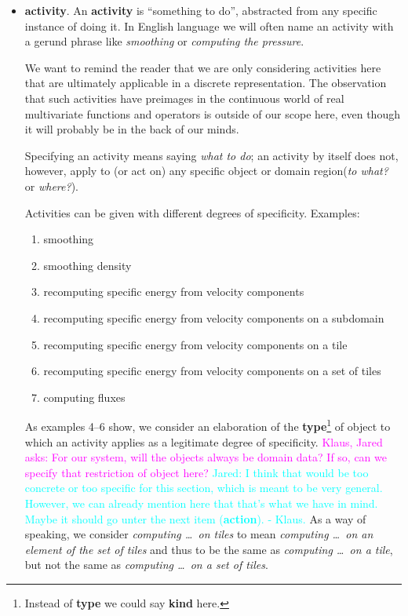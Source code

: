 \documentclass{article}
\newcommand{\JaredRfromKW}[1]   {\textcolor{cyan}{Jared: #1 - Klaus.}}
\newcommand{\KlausQfromJO}[1]   {\textcolor{magenta}{Klaus, Jared asks: #1}}
\newcommand{\domregion}              {domain region\xspace}    %
\begin{document}
\begin{itemize}
\item \textbf{activity}.
An \textbf{activity} is ``something to do'', abstracted from any
specific instance of doing it.
In English language we will often name an activity with a
gerund phrase like \emph{smoothing} or \emph{computing the pressure}.

We want to remind the reader that we are only considering activities
here that are ultimately applicable in a discrete representation.
The observation that such activities have preimages in the continuous
world of real multivariate functions and operators is outside
of our scope here, even though it will probably be in the back of our minds.

Specifying an activity
means saying \textit{what to do}; an activity by itself  does not,
however, apply to (or act on) any specific object or \domregion (\textit{to what?} or \textit{where?}).

Activities can be given with different degrees of specificity.
Examples:
\begin{enumerate}
\item smoothing
\item smoothing density
\item recomputing specific energy from velocity components
\item recomputing specific energy from velocity components on a subdomain
\item recomputing specific energy from velocity components on a tile
\item recomputing specific energy from velocity components on a set of tiles
\item computing fluxes
\end{enumerate}
As examples 4--6 show, we consider an elaboration of the \textbf{type}\footnote{
Instead of \textbf{type} we could say \textbf{kind} here.}
 of object to which
an activity applies as a legitimate degree of specificity.  \KlausQfromJO{For
our system, will the objects always be domain data?  If so, can we specify that
restriction of object here?}
\JaredRfromKW{I think that would be too concrete or too specific for this
section, which is meant to be very general. However, we can already mention
here that that's what we have in mind. Maybe it should go unter the
next item (\textbf{action}).}
As a way of speaking, we consider \emph{computing \ldots\ on tiles}
to mean \emph{computing \ldots\ on an element of the set of tiles} and thus
to be the same as \emph{computing \ldots\ on a tile}, but not
the same as \emph{computing \ldots\ on a set of tiles}.


\end{itemize}
\end{document}

